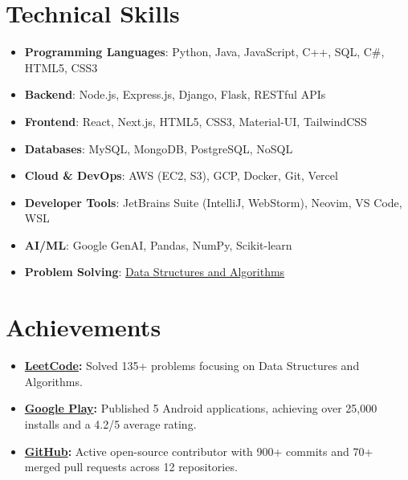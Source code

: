 \documentclass[letterpaper,11pt]{article}
\newcommand{\resumeItem}[1]{
  \item\small{#1 \vspace{-2pt}}
}
\newcommand{\resumeSubHeadingListStart}{\begin{itemize}[leftmargin=0.15in, label={}]}
\newcommand{\resumeSubHeadingListEnd}{\end{itemize}}
\begin{document}
\section{Technical Skills}
\resumeSubHeadingListStart
  \resumeItem{\textbf{Programming Languages}: Python, Java, JavaScript, C++, SQL, C\#, HTML5, CSS3}
  \resumeItem{\textbf{Backend}: Node.js, Express.js, Django, Flask, RESTful APIs}
  \resumeItem{\textbf{Frontend}: React, Next.js, HTML5, CSS3, Material-UI, TailwindCSS}
  \resumeItem{\textbf{Databases}: MySQL, MongoDB, PostgreSQL, NoSQL}
  \resumeItem{\textbf{Cloud \& DevOps}: AWS (EC2, S3), GCP, Docker, Git, Vercel}
  \resumeItem{\textbf{Developer Tools}: JetBrains Suite (IntelliJ, WebStorm), Neovim, VS Code, WSL}
  \resumeItem{\textbf{AI/ML}: Google GenAI, Pandas, NumPy, Scikit-learn}
  \resumeItem{\textbf{Problem Solving}: \href{https://github.com/abhay-byte/DSA_Practice}{Data Structures and Algorithms}}
\resumeSubHeadingListEnd

\section{Achievements}
\resumeSubHeadingListStart
  \resumeItem{\textbf{\href{https://leetcode.com/u/abhay-byte/}{LeetCode}:} Solved 135+ problems focusing on Data Structures and Algorithms.}
  \resumeItem{\textbf{\href{https://play.google.com/store/apps/dev?id=8004929841101888920&hl=en_US&gl=US}{Google Play}:} Published 5 Android applications, achieving over 25,000 installs and a 4.2/5 average rating.}
  \resumeItem{\textbf{\href{https://github.com/abhay-byte/}{GitHub}:} Active open-source contributor with 900+ commits and 70+ merged pull requests across 12 repositories.}
\resumeSubHeadingListEnd

\end{document}
